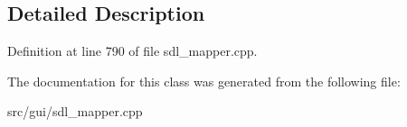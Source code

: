 \subsection{Detailed Description}


Definition at line 790 of file sdl\-\_\-mapper.\-cpp.



The documentation for this class was generated from the following file\-:\begin{DoxyCompactItemize}
\item 
src/gui/sdl\-\_\-mapper.\-cpp\end{DoxyCompactItemize}
